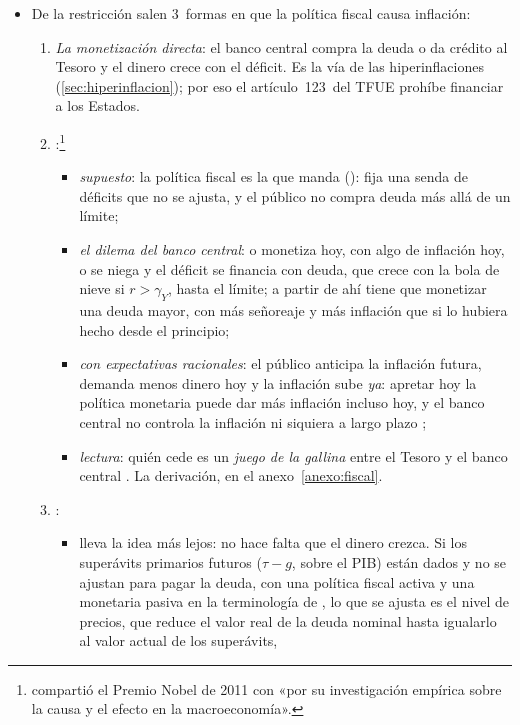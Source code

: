 \documentclass[11pt]{article}
\begin{document}
\begin{itemize}
\item De la restricción salen 3~formas en que la política fiscal causa inflación:
  \begin{enumerate}
  \item \emph{La monetización directa}: el banco central compra la deuda o da crédito al Tesoro y el dinero crece con el déficit. Es la vía de las hiperinflaciones (\ref{sec:hiperinflacion}); por eso el artículo~123~del TFUE prohíbe financiar a los Estados\nocite{TFUE2016}.
  \item {}\nocite{SargentWallace1981}:\footnote{ compartió el Premio Nobel de 2011 con  «por su investigación empírica sobre la causa y el efecto en la macroeconomía»\nocite{Nobel2011SargentSims}.}
    \begin{itemize}
    \item \emph{supuesto}: la política fiscal es la que manda (): fija una senda de déficits que no se ajusta, y el público no compra deuda más allá de un límite;
    \item \emph{el dilema del banco central}: o monetiza hoy, con algo de inflación hoy, o se niega y el déficit se financia con deuda, que crece con la bola de nieve si $r>\gamma_Y$, hasta el límite; a partir de ahí tiene que monetizar una deuda mayor, con más señoreaje y más inflación que si lo hubiera hecho desde el principio;
    \item \emph{con expectativas racionales}: el público anticipa la inflación futura, demanda menos dinero hoy y la inflación sube \emph{ya}: apretar hoy la política monetaria puede dar más inflación incluso hoy, y el banco central no controla la inflación ni siquiera a largo plazo ;
    \item \emph{lectura}: quién cede es un \emph{juego de la gallina} entre el Tesoro y el banco central\nocite{BarthelemyPlantin2019Fiscal} . La derivación, en el anexo~\ref{anexo:fiscal}.
    \end{itemize}
  \item {}\nocite{Leeper1991,Sims1994Simple,Woodford1995Price}:
    \begin{itemize}
    \item lleva la idea más lejos: no hace falta que el dinero crezca. Si los superávits primarios futuros ($\tau-g$, sobre el PIB) están dados y no se ajustan para pagar la deuda, con una política fiscal activa y una monetaria pasiva en la terminología de \textcite{Leeper1991}, lo que se ajusta es el nivel de precios, que reduce el valor real de la deuda nominal hasta igualarlo al valor actual de los superávits,

\end{itemize}
\end{enumerate}
\end{itemize}
\end{document}

